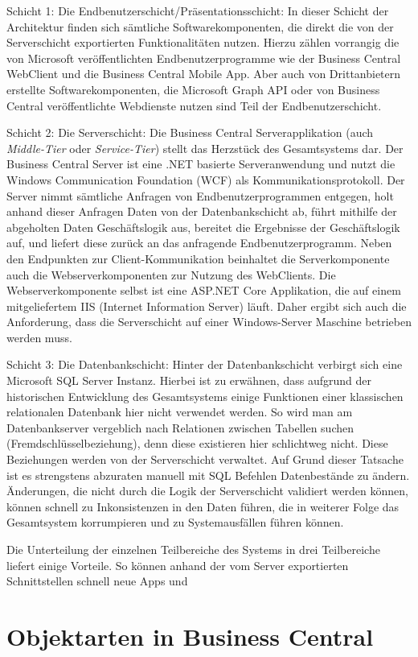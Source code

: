 \pagebreak

Schicht 1: Die Endbenutzerschicht/Präsentationsschicht: 
In dieser Schicht der Architektur finden sich sämtliche Softwarekomponenten, die direkt die von der Serverschicht exportierten Funktionalitäten nutzen. Hierzu zählen vorrangig die von Microsoft veröffentlichten Endbenutzerprogramme wie der Business Central WebClient und die Business Central Mobile App. Aber auch von Drittanbietern erstellte Softwarekomponenten, die Microsoft Graph API oder von Business Central veröffentlichte Webdienste nutzen sind Teil der Endbenutzerschicht.
\linebreak

Schicht 2: Die Serverschicht: 
Die Business Central Serverapplikation (auch \textit{Middle-Tier} oder \textit{Service-Tier}) stellt das Herzstück des Gesamtsystems dar. Der Business Central Server ist eine .NET basierte Serveranwendung und nutzt die Windows Communication Foundation (WCF) als Kommunikationsprotokoll. Der Server nimmt sämtliche Anfragen von Endbenutzerprogrammen entgegen, holt anhand dieser Anfragen Daten von der Datenbankschicht ab, führt mithilfe der abgeholten Daten Geschäftslogik aus, bereitet die Ergebnisse der Geschäftslogik auf, und liefert diese zurück an das anfragende Endbenutzerprogramm. Neben den Endpunkten zur Client-Kommunikation beinhaltet die Serverkomponente auch die Webserverkomponenten zur Nutzung des WebClients. Die Webserverkomponente selbst ist eine ASP.NET Core Applikation, die auf einem mitgeliefertem IIS (Internet Information Server) läuft. Daher ergibt sich auch die Anforderung, dass die Serverschicht auf einer Windows-Server Maschine betrieben werden muss.
\linebreak

Schicht 3: Die Datenbankschicht:
Hinter der Datenbankschicht verbirgt sich eine Microsoft SQL Server Instanz. Hierbei ist zu erwähnen, dass aufgrund der historischen Entwicklung des Gesamtsystems einige Funktionen einer klassischen relationalen Datenbank hier nicht verwendet werden. So wird man am Datenbankserver vergeblich nach Relationen zwischen Tabellen suchen (Fremdschlüsselbeziehung), denn diese existieren hier schlichtweg nicht. Diese Beziehungen werden von der Serverschicht verwaltet. Auf Grund dieser Tatsache ist es strengstens abzuraten manuell mit SQL Befehlen Datenbestände zu ändern. Änderungen, die nicht durch die Logik der Serverschicht validiert werden können, können schnell zu Inkonsistenzen in den Daten führen, die in weiterer Folge das Gesamtsystem korrumpieren und zu Systemausfällen führen können. 
\linebreak

Die Unterteilung der einzelnen Teilbereiche des Systems in drei Teilbereiche liefert einige Vorteile. So können anhand der vom Server exportierten Schnittstellen schnell neue Apps und 



\pagebreak
\section{Objektarten in Business Central}
\label{sec:Objektarten in Business Central}